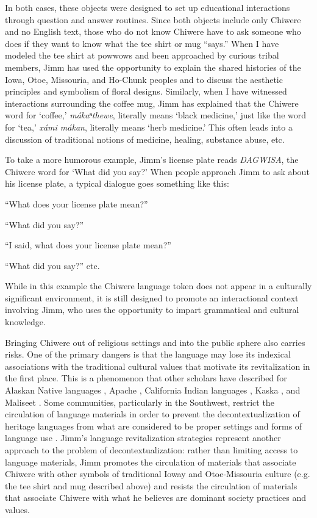 \documentclass[output=paper]{LSP/langsci}
\begin{document}
In both cases, these objects were designed to set up educational interactions through question and answer routines. Since both objects include only Chiwere and no English text, those who do not know Chiwere have to ask someone who does if they want to know what the tee shirt or mug ``says.'' When I have modeled the tee shirt at powwows and been approached by curious tribal members, Jimm has used the opportunity to explain the shared histories of the Iowa, Otoe, Missouria, and Ho-Chunk peoples and to discuss the aesthetic principles and symbolism of floral designs. Similarly, when I have witnessed interactions surrounding the coffee mug, Jimm has explained that the Chiwere word for `coffee,' \emph{mákaⁿthewe}, literally means `black medicine,' just like the word for `tea,' \emph{xámi mákan}, literally means `herb medicine.' This often leads into a discussion of traditional notions of medicine, healing, substance abuse, etc.

To take a more humorous example, Jimm's license plate reads \emph{DAGWISA}, the Chiwere word for `What did you say?' When people approach Jimm to ask about his license plate, a typical dialogue goes something like this:

	``What does your license plate mean?''
	
	``What did you say?''
	
	``I said, what does your license plate mean?''
	
	``What did you say?'' etc.
	
While in this example the Chiwere language token does not appear in a culturally significant environment, it is still designed to promote an interactional context involving Jimm, who uses the opportunity to impart grammatical and cultural knowledge.

Bringing Chiwere out of religious settings and into the public sphere also carries risks. One of the primary dangers is that the language may lose its indexical associations with the traditional cultural values that motivate its revitalization in the first place. This is a phenomenon that other scholars have described for Alaskan Native languages \citep{DauenhauerDauenhauer1998}, Apache \citep{Nevins2013, Samuels2006}, California Indian languages \citep{Ahlers2006}, Kaska \citep{Meek2010}, and Maliseet \citep{Perley2011}. Some communities, particularly in the Southwest, restrict the circulation of language materials in order to prevent the decontextualization of heritage languages from what are considered to be proper settings and forms of language use \citep{Debenport2015, Whiteley2003}. Jimm's language revitalization strategies represent another approach to the problem of decontextualization: rather than limiting access to language materials, Jimm promotes the circulation of materials that associate Chiwere with other symbols of traditional Ioway and Otoe-Missouria culture (e.g. the tee shirt and mug described above) and resists the circulation of materials that associate Chiwere with what he believes are dominant society practices and values.
\end{document}
